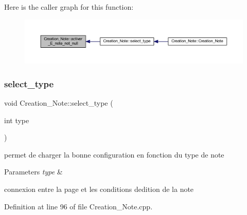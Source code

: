 Here is the caller graph for this function\+:\nopagebreak
\begin{figure}[H]
\begin{center}
\leavevmode
\includegraphics[width=350pt]{class_creation___note_ad786b2c2e3273160009e560a8de2ab6c_icgraph}
\end{center}
\end{figure}
\mbox{\label{class_creation___note_a4627e5957db87af2b7c43937857e9d6e}} 
\subsubsection{\texorpdfstring{select\+\_\+type}{select\_type}}
{\footnotesize\ttfamily void Creation\+\_\+\+Note\+::select\+\_\+type (\begin{DoxyParamCaption}\item[{int}]{type }\end{DoxyParamCaption})\hspace{0.3cm}{\ttfamily [slot]}}



permet de charger la bonne configuration en fonction du type de note 


\begin{DoxyParams}{Parameters}
{\em type} & \\
\hline
\end{DoxyParams}
connexion entre la page et les conditions d\textquotesingle{}edition de la note 

Definition at line 96 of file Creation\+\_\+\+Note.\+cpp.

